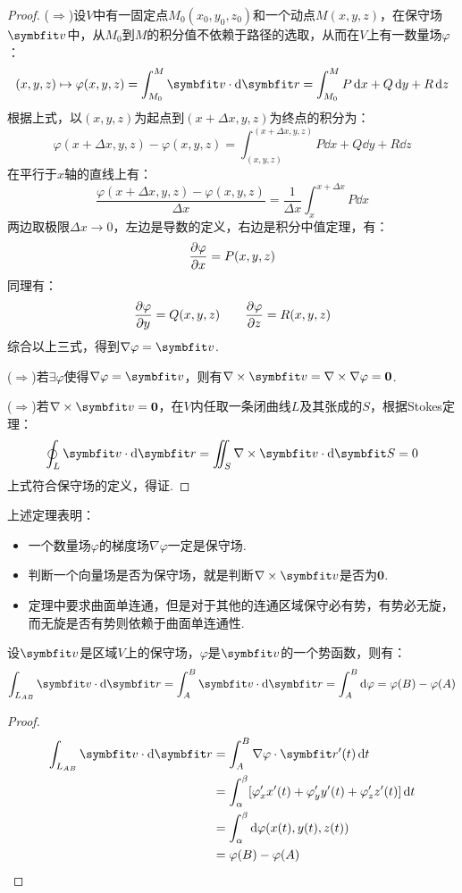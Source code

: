 \begin{proof}
    ($\Rightarrow$)设$V$中有一固定点$M_0(x_0,y_0,z_0)$和一个动点$M(x,y,z)$，在保守场$\vb{v}$中，从$M_0$到$M$的积分值不依赖于路径的选取，从而在$V$上有一数量场$\varphi$：
    \[(x,y,z)\mapsto\varphi(x,y,z) = \int_{M_0}^{M}\vb{v}\cdot\dd{\vb{r}} = \int_{M_0}^{M}P\dd{x}+Q\dd{y}+R\dd{z}\]
    根据上式，以$(x,y,z)$为起点到$(x+\Delta x,y,z)$为终点的积分为：
    \[\varphi(x+\Delta x,y,z) - \varphi(x,y,z) = \int_{(x,y,z)}^{(x+\Delta x,y,z)}P\dd{x}+Q\dd{y}+R\dd{z}\]
    在平行于$x$轴的直线上有：
    \[\frac{\varphi(x+\Delta x,y,z)-\varphi(x,y,z)}{\Delta x} = \frac{1}{\Delta x}\int_{x}^{x+\Delta x}P\dd{x}\]
    两边取极限$\Delta x \to 0$，左边是导数的定义，右边是积分中值定理，有：
    \[\pdv{\varphi}{x} = P(x,y,z)\]
    同理有：
    \[\pdv{\varphi}{y} = Q(x,y,z) \qquad \pdv{\varphi}{z} = R(x,y,z)\]
    综合以上三式，得到$\nabla\varphi = \vb{v}$.

    ($\Rightarrow$)若$\exists\varphi$使得$\nabla\varphi = \vb{v}$，则有$\nabla\times\vb{v} = \nabla\times\nabla\varphi = \bm{0}$.

    ($\Rightarrow$)若$\nabla\times\vb{v}=\bm{0}$，在$V$内任取一条闭曲线$L$及其张成的$S$，根据Stokes定理：
    \[\oint_L\vb{v}\cdot\dd{\vb{r}} = \iint_S\nabla\times\vb{v}\cdot\dd{\vb{S}} = 0\]
    上式符合保守场的定义，得证.
\end{proof}

上述定理表明：
\begin{itemize}
    \item 一个数量场$\varphi$的梯度场$\nabla\varphi$一定是保守场.
    \item 判断一个向量场是否为保守场，就是判断$\nabla\times\vb{v}$是否为$\bm{0}$.
    \item 定理中要求曲面单连通，但是对于其他的连通区域保守必有势，有势必无旋，而无旋是否有势则依赖于曲面单连通性.
\end{itemize}

\begin{theorem}
    设$\vb{v}$是区域$V$上的保守场，$\varphi$是$\vb{v}$的一个势函数，则有：
    \[\int_{L_{AB}}\vb{v}\cdot\dd{\vb{r}} = \int_A^B \vb{v}\cdot\dd{\vb{r}} = \int_{A}^{B}\dd{\varphi} = \varphi(B)-\varphi(A)\]
\end{theorem}

\begin{proof}
    \begin{align*}
        \int_{L_{AB}}\vb{v}\cdot\dd{\vb{r}} &= \int_{A}^{B}\nabla\varphi\cdot\vb{r}'(t)\dd{t}\\
        &= \int_{\alpha}^{\beta}[\varphi'_x x'(t) + \varphi'_y y'(t) + \varphi'_z z'(t)]\dd{t}\\
        &= \int_{\alpha}^{\beta}\dd{\varphi(x(t),y(t),z(t))}\\
        &= \varphi(B) - \varphi(A)
    \end{align*}
\end{proof}


